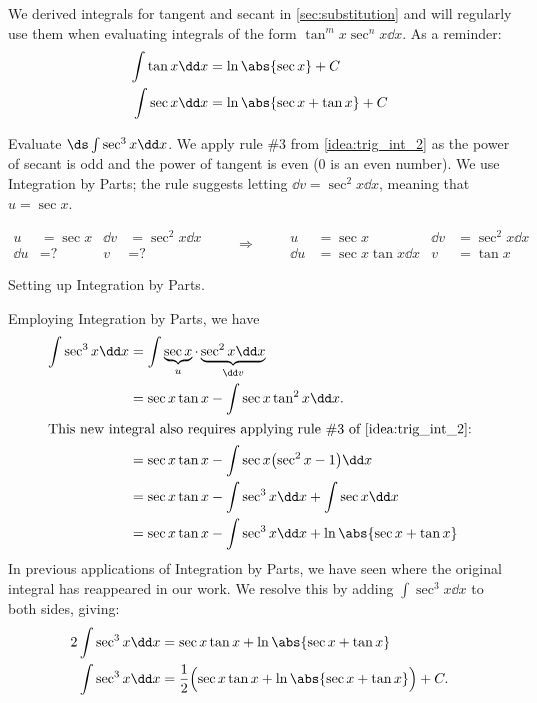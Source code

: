 We derived integrals for tangent and secant in \autoref{sec:substitution} and will regularly use them when evaluating integrals of the form $\tan^m x \sec^n x \dd x$.  As a reminder:
\begin{align*}
 \int\tan x\dd x &=\ln\abs{\sec x}+C \\
 \int\sec x\dd x &=\ln\abs{\sec x+\tan x}+C
\end{align*}

\begin{example}\label{ex_trigint6}
Evaluate $\ds\int \sec^3x\dd x$.
\solution
We apply rule \#3 from \autoref{idea:trig_int_2} as the power of secant is odd and the power of tangent is even (0 is an even number). We use Integration by Parts; the rule suggests letting $\dd v = \sec^2x\dd x$, meaning that $u = \sec x$. \\
\noindent\begin{minipage}[t]{\linewidth}\noindent%
\captionsetup{type=figure}%
\[
\begin{aligned}
u&= \sec x & \dd v&=\sec^2 x\dd x\\
\dd u&= \text{?} & v&=\text{?}
\end{aligned}
\qquad\Rightarrow\qquad
\begin{aligned}
u&= \sec x & \dd v&=\sec^2 x\dd x\\
\dd u&= \sec x\tan x\dd x & v&=\tan x
\end{aligned}
\]
\caption{Setting up Integration by Parts.}\label{fig:trigint1}
\end{minipage}

Employing Integration by Parts, we have
\begin{align*}
\int \sec^3x\dd x
 	&=	\int \underbrace{\sec x}_u\cdot\underbrace{\sec^2 x\dd x}_{\dd v}\\
	&=	\sec x\tan x - \int \sec x\tan^2x\dd x. \\
\intertext{This new integral also requires applying rule \#3 of \autoref{idea:trig_int_2}:}
	&= \sec x\tan x - \int \sec x \bigl(\sec^2 x-1\bigr)\dd x\\
	&=	\sec x\tan x - \int \sec^3x\dd x + \int \sec x\dd x \\
	&= \sec x\tan x -\int \sec^3x\dd x + \ln\abs{\sec x+\tan x}
\end{align*}
%
%
In previous applications of Integration by Parts, we have seen where the original integral has reappeared in our work. We resolve this by adding $\int \sec^3x\dd x$ to both sides, giving:
\begin{align*}
2\int \sec^3x\dd x &= \sec x\tan x + \ln\abs{\sec x+\tan x} \\
\int \sec^3x\dd x &= \frac12\Bigl(\sec x\tan x + \ln\abs{\sec x+\tan x}\Bigr)+C.
\end{align*}
\end{example}

